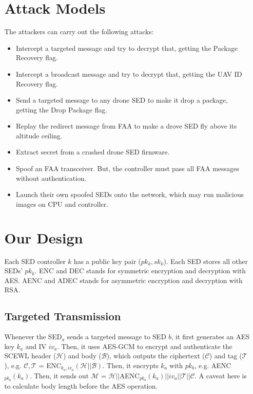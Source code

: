 \documentclass[11pt,oneside,onecolumn,letterpaper]{article}
\begin{document}
\section{Attack Models}

The attackers can carry out the following attacks:

\begin{itemize}
	\item Intercept a targeted message and try to decrypt that, getting the Package Recovery flag.

	\item Intercept a broadcast message and try to decrypt that, getting the UAV ID Recovery flag.	
	
	\item Send a targeted message to any drone SED to make it drop a package, getting the Drop Package flag.		
	
	\item Replay the redirect message from FAA to make a drove SED fly above its altitude ceiling.
	
	\item Extract secret from a crashed drone SED firmware.  
	
	\item Spoof an FAA transceiver. But, the controller must pass all FAA messages without authentication.
	
	\item Launch their own spoofed SEDs onto the network, which may run malicious images on CPU and controller.
\end{itemize}

\section{Our Design}
Each SED controller $k$ has a public key pair ($pk_k, sk_k$).
Each SED stores all other SEDs' $pk_k$.
ENC and DEC stands for symmetric encryption and decryption with AES.
AENC and ADEC stands for asymmetric encryption and decryption with RSA.

\subsection{Targeted Transmission}
Whenever the SED$_a$ sends a targeted message to SED $b$, it first generates an AES key $k_a$ and IV $iv_a$. 
Then, it uses AES-GCM to encrypt and authenticate the SCEWL header ($\mathcal{H}$) and body ($\mathcal{B}$), which outputs the ciphertext ($\mathcal{C}$) and tag ($\mathcal{T}$), e.g. $\mathcal{C}, \mathcal{T}$ = ENC$_{k_a, iv_a}(\mathcal{H} || \mathcal{B})$.
Then, it encrypts $k_a$ with $pk_b$, e.g. AENC$_{pk_b}(k_a)$.
Then, it sends out $\mathcal{M}$ = $\mathcal{H} || $AENC$_{pk_b}(k_a)||iv_a||\mathcal{T}||\mathcal{C}$.
A caveat here is to calculate body length before the AES operation.
\end{document}
